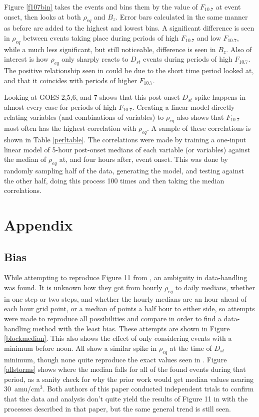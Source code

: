 \documentclass[10pt,twocolumn]{article}
\begin{document}
Figure \ref{f107bin} takes the events and bins them by the value of $F_{10.7}$ at event onset, then looks at both $\rho_{eq}$ and $B_z$. Error bars calculated in the same manner as before are added to the highest and lowest bins. A significant difference is seen in $\rho_{eq}$ between events taking place during periods of high $F_{10.7}$ and low $F_{10.7}$, while a much less significant, but still noticeable, difference is seen in $B_z$. Also of interest is how $\rho_{eq}$ only sharply reacts to $D_{st}$ events during periods of high $F_{10.7}$. The positive relationship seen in \cite{Takahashi2010} could be due to the short time period looked at, and that it coincides with periods of higher $F_{10.7}$.

Looking at GOES 2,5,6, and 7 shows that this post-onset $D_{st}$ spike happens in almost every case for periods of high $F_{10.7}$. Creating a linear model directly relating variables (and combinations of variables) to $\rho_{eq}$ also shows that $F_{10.7}$ most often has the highest correlation with $\rho_{eq}$. A sample of these correlations is shown in Table \ref{perltable}. The correlations were made by training a one-input linear model of 5-hour post-onset medians of each variable (or variables) against the median of $\rho_{eq}$ at, and four hours after, event onset. This was done by randomly sampling half of the data, generating the model, and testing against the other half, doing this process 100 times and then taking the median correlations.




\section{Appendix}
\subsection{Bias}
While attempting to reproduce Figure 11 from \cite{Takahashi2010}, an ambiguity in data-handling was found. It is unknown how they got from hourly $\rho_{eq}$ to daily medians, whether in one step or two steps, and whether the hourly medians are an hour ahead of each hour grid point, or a median of points a half hour to either side, so attempts were made to reproduce all possibilities and compare in order to find a data-handling method with the least bias. These attempts are shown in Figure \ref{blockmedian}. This also shows the effect of only considering events with a minimum before noon. All show a similar spike in $\rho_{eq}$ at the time of $D_{st}$ minimum, though none quite reproduce the exact values seen in \cite{Takahashi2010}. Figure \ref{allstorms} shows where the median falls for all of the found events during that period, as a sanity check for why the prior work would get median values nearing $30$~amu/cm$^3$. Both authors of this paper conducted independent trials to confirm that the data and analysis don't quite yield the results of Figure 11 in \cite{Takahashi2010} with the processes described in that paper, but the same general trend is still seen. 
\end{document}
